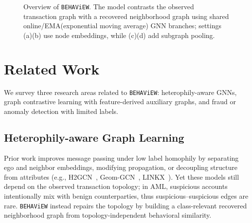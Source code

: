 \documentclass[sigconf,natbib=true,anonymous=true]{acmart}
\theoremstyle{definition}
\newcommand{\method}{\texttt{BEHAViEW}\xspace}
\begin{document}
\begin{figure}[h]
{}%
\caption{Overview of \method. The model contrasts the observed transaction graph with a recovered neighborhood graph using shared online/EMA(exponential moving average) GNN branches; settings (a)(b) use node embeddings, while (c)(d) add subgraph pooling.}
\label{fig:framework}
\end{figure}

\section{Related Work}\label{sec:related_work}
We survey three research areas related to \method: heterophily-aware GNNs, graph contrastive learning with feature-derived auxiliary graphs, and fraud or anomaly detection with limited labels.

\subsection{Heterophily-aware Graph Learning}
Prior work improves message passing under low label homophily by separating ego and neighbor embeddings, modifying propagation, or decoupling structure from attributes (e.g., H2GCN~\cite{zhu2020beyond}, Geom-GCN~\cite{pei2020geom}, LINKX~\cite{zhu2021linkx}). Yet these models still depend on the observed transaction topology; in AML, suspicious accounts intentionally mix with benign counterparties, thus suspicious–suspicious edges are rare. \method instead repairs the topology by building a class-relevant recovered neighborhood graph from topology-independent behavioral similarity.
\end{document}
